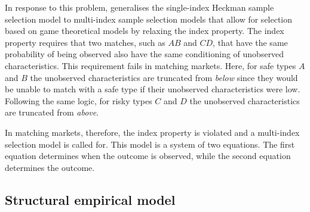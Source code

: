 In response to this problem, \citet{Sorensen2007b} generalises the single-index Heckman sample selection model to multi-index sample selection models that allow for selection based on game theoretical models by relaxing the index property. The index property requires that two matches, such as $AB$ and $CD$, that have the same probability of being observed also have the same conditioning of unobserved characteristics. This requirement fails in matching markets. Here, for safe types $A$ and $B$ the unobserved characteristics are truncated from \textit{below} since they would be unable to match with a safe type if their unobserved characteristics were low. Following the same logic, for risky types $C$ and $D$ the unobserved characteristics are truncated from \textit{above}. 

In matching markets, therefore, the index property is violated and a multi-index selection model is called for. 
This model is a system of two equations. The first equation determines when the outcome is observed, while the second equation determines the outcome. %


\subsection{Structural empirical model} 

